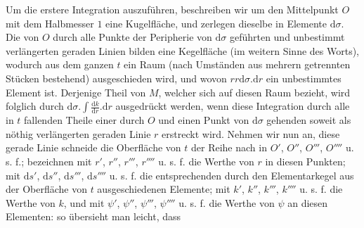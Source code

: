 Um die erstere Integration auszuführen, beschreiben wir um den Mittelpunkt $O$ mit dem Halbmesser $1$ eine Kugelfläche, und zerlegen dieselbe in Elemente $\mathrm{d}\sigma$. Die von $O$ durch alle Punkte der Peripherie von $\mathrm{d}\sigma$ geführten und unbestimmt verlängerten geraden Linien bilden eine Kegelfläche (im weitern Sinne des Worts), wodurch aus dem ganzen $t$ ein Raum (nach Umständen aus mehrern getrennten Stücken bestehend) ausgeschieden wird, und wovon $rr\mathrm{d}\sigma.\mathrm{d}r$ ein unbestimmtes Element ist. Derjenige Theil von $M$, welcher sich auf diesen Raum bezieht, wird folglich durch $\mathrm{d}\sigma.\int\frac{\mathrm{d}k}{\mathrm{d}r}.\mathrm{d}r$ ausgedrückt werden, wenn diese Integration durch alle in $t$ fallenden Theile einer durch $O$ und einen Punkt von $\mathrm{d}\sigma$ gehenden soweit als nöthig verlängerten geraden Linie $r$ erstreckt wird. Nehmen wir nun an, diese gerade Linie schneide die Oberfläche von $t$ der Reihe nach in $O'$, $O''$, $O'''$, $O''''$ u. s. f.; bezeichnen mit $r'$, $r''$, $r'''$, $r''''$ u. s. f. die Werthe von $r$ in diesen Punkten; mit $\mathrm{d}s'$, $\mathrm{d}s''$, $\mathrm{d}s'''$, $\mathrm{d}s''''$ u. s. f. die entsprechenden durch den Elementarkegel aus der Oberfläche von $t$ ausgeschiedenen Elemente; mit $k'$, $k''$, $k'''$, $k''''$ u. s. f. die Werthe von $k$, und mit $\psi'$, $\psi''$, $\psi'''$, $\psi''''$ u. s. f. die Werthe von $\psi$ an diesen Elementen: so übersieht man leicht, dass
%

